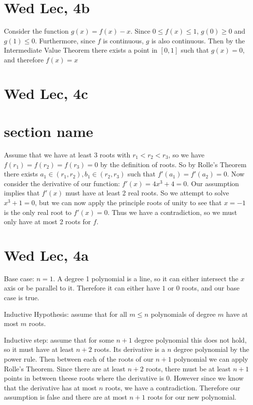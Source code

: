 \documentclass[12pt]{article}
\begin{document}
\section{Wed Lec, 4b}
Consider the function $g(x) = f(x)-x$. Since $0 \leq f(x) \leq 1$, $g(0) \geq 0$ and $g(1) \leq 0$. Furthermore, since $f$ is continuous, $g$ is also continuous. Then by the Intermediate Value Theorem there exists a point in $[0,1]$ such that $g(x)=0$, and therefore $f(x)=x$

\section{Wed Lec, 4c}


\section{section name}
Assume that we have at least 3 roots with $r_1 < r_2 < r_3$, so we have $f(r_1)=f(r_2)=f(r_3)=0$ by the definition of roots. So by Rolle's Theorem there exists $a_1 \in (r_1, r_2), b_1 \in (r_2, r_3)$ such that $f'(a_1)=f'(a_2)=0$.
\newline
Now consider the derivative of our function: $f'(x)=4x^3+4=0$. Our assumption implies that $f'(x)$ must have at least 2 real roots. So we attempt to solve $x^3+1=0$, but we can now apply the principle roots of unity to see that $x=-1$ is the only real root to $f'(x)=0$. Thus we have a contradiction, so we must only have at most 2 roots for $f$.

\section{Wed Lec, 4a}
Base case: $n=1$. A degree 1 polynomial is a line, so it can either intersect the $x$ axis or be parallel to it. Therefore it can either have $1$ or $0$ roots, and our base case is true.
\newline

Inductive Hypothesis: assume that for all $m \leq n$ polynomials of degree $m$ have at most $m$ roots.
\newline

Inductive step: assume that for some $n+1$ degree polynomial this does not hold, so it must have at least $n+2$ roots. Its derivative is a $n$ degree polynomial by the power rule. Then between each of the roots of our $n+1$ polynomial we can apply Rolle's Theorem. Since there are at least $n+2$ roots, there must be at least $n+1$ points in between theese roots where the derivative is 0. However since we know that the derivative has at most $n$ roots, we have a contradiction. Therefore our assumption is false and there are at most $n+1$ roots for our new polynomial.
\end{document}
